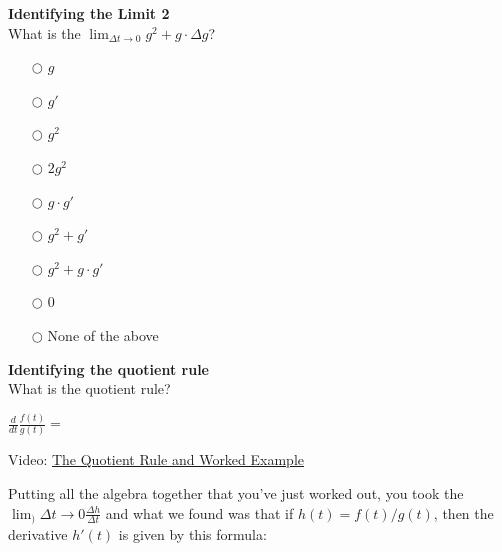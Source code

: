 \documentclass[pdftex, brazil, 12pt, twoside]{article}
\begin{document}
\begin{exercise}
  \textbf{Identifying the Limit 2}\\%
  What is the $\displaystyle \lim_{\Delta t \to 0}{g^2 + g \cdot \Delta g}$?
\begin{itemize}
\item[$\bigcirc$] $g$
\item[$\bigcirc$] $g'$
\item[$\bigcirc$] $g^2$
\item[$\bigcirc$] $2g^2$
\item[$\bigcirc$] $g \cdot g'$
\item[$\bigcirc$] $g^2 + g'$
\item[$\bigcirc$] $g^2 + g \cdot g'$
\item[$\bigcirc$] $0$
\item[$\bigcirc$] None of the above
\end{itemize}
\end{exercise}

\begin{exercise}
  \textbf{Identifying the quotient rule}\\%
  What is the quotient rule?

  $\displaystyle \frac{d}{dt} \frac{f(t)}{g(t)} =$
\end{exercise}

Video: \href{https://www.youtube.com/watch?v=3qBxKpSApAU}{The Quotient Rule and Worked Example}

Putting all the algebra together that you've just worked out,
you took the $\displaystyle \lim_){\Delta t \to 0}{\frac{\Delta h}{\Delta t}}$
and what we found was that if $h(t) = f(t)/g(t)$, then the derivative
$h'(t)$ is given by this formula:

\begin{figure}[H]
  \begin{center}
  \end{center}
\end{figure}
\end{document}
